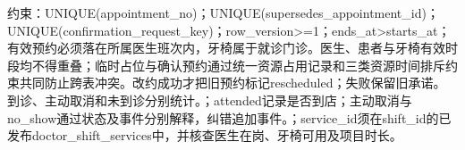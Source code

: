 \documentclass[UTF8,12pt,a4paper,fontset=none]{ctexart}
\begin{document}
约束：UNIQUE(\allowbreak{}appointment\_\allowbreak{}no)\allowbreak{}；UNIQUE(\allowbreak{}supersedes\_\allowbreak{}appointment\_\allowbreak{}id)\allowbreak{}；UNIQUE(\allowbreak{}confirmation\_\allowbreak{}request\_\allowbreak{}key)\allowbreak{}；row\_\allowbreak{}version>\allowbreak{}=\allowbreak{}1；ends\_\allowbreak{}at>\allowbreak{}starts\_\allowbreak{}at；有效预约必须落在所属医生班次内，牙椅属于就诊门诊。医生、患者与牙椅有效时段均不得重叠；临时占位与确认预约通过统一资源占用记录和三类资源时间排斥约束共同防止跨表冲突。改约成功才把旧预约标记rescheduled；失败保留旧承诺。到诊、主动取消和未到诊分别统计。；attended记录是否到店；主动取消与no\_\allowbreak{}show通过状态及事件分别解释，纠错追加事件。；service\_\allowbreak{}id须在shift\_\allowbreak{}id的已发布doctor\_\allowbreak{}shift\_\allowbreak{}services中，并核查医生在岗、牙椅可用及项目时长。\par
\Needspace{511pt}
\end{document}
